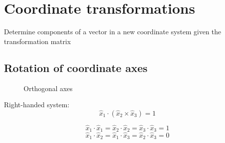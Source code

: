 
\chapter{Coordinate transformations}
\label{ch:coordtrans}

\begin{lo3}
Determine components of a vector in a new coordinate system given the transformation matrix
\end{lo3}

\section{Rotation of coordinate axes}

\begin{figure}[h]
\begin{center}
\end{center}
\caption{Orthogonal axes}
\label{orthogonalaxes1}
\end{figure}


Right-handed system: 
$$ \hat{x}_1 \cdot \left( \hat{x}_2 \times \hat{x}_3 \right) = 1 $$

$$ \hat{x}_1 \cdot \hat{x}_1 = \hat{x}_2 \cdot \hat{x}_2 = \hat{x}_3 \cdot \hat{x}_3 = 1 $$
$$ \hat{x}_1 \cdot \hat{x}_2 = \hat{x}_1 \cdot \hat{x}_3 = \hat{x}_2 \cdot \hat{x}_3 = 0 $$


